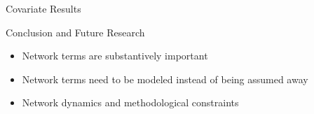 \documentclass{beamer}
\begin{document}
\begin{frame}{Covariate Results}

\end{frame}






\begin{frame}{Conclusion and Future Research}

\begin{itemize}
\item{Network terms are substantively important}
\item{Network terms need to be modeled instead of being assumed away}
\item{Network dynamics and methodological constraints}
\end{itemize}





\end{frame}
\end{document}
